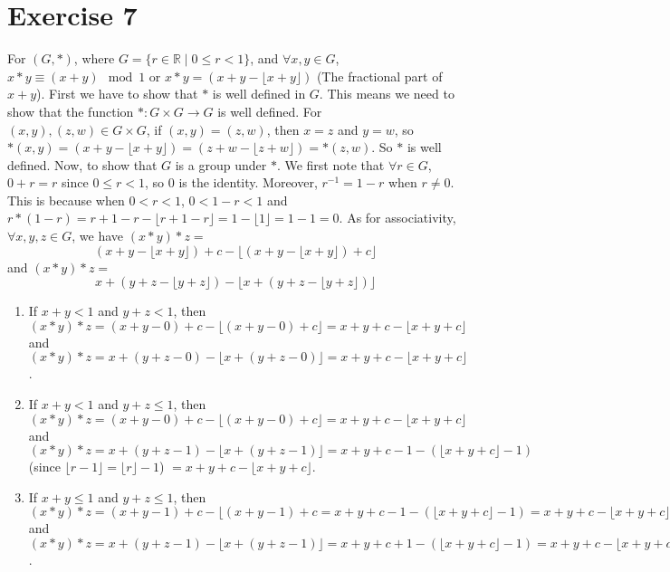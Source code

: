 \documentclass[12pt]{article}
\newcommand{\R}{\mathbb{R}}
\begin{document}
    \section*{Exercise 7}
    For $(G, \ast)$, where $G = \{r \in \R \mid 0 \leqslant r < 1\}$,
    and $\forall x, y \in G$, 
    $x \ast y \equiv (x + y) \mod{1}$
    or $x \ast y = (x + y - \lfloor x + y \rfloor)$
    (The fractional part of $x + y$).
    First we have to show that $\ast$ is well defined in $G$. 
    This means we need to show that the function $\ast:G \times G \to G$
    is well defined.
    For $(x, y), (z, w) \in G \times G$,
    if $(x, y) = (z, w)$,
    then $x = z$ and $y = w$,
    so $\ast(x, y) 
    = (x + y - \lfloor x + y \rfloor) 
    = (z + w - \lfloor z + w \rfloor) 
    = \ast(z, w)$.
    So $\ast$ is well defined.
    Now, to show that $G$ is a group under $\ast$.
    We first note that $\forall r \in G$, $0 + r = r$
    since $0 \leqslant r < 1$,
    so $0$ is the identity.
    Moreover, $r^{-1} = 1 - r$
    when $r \neq 0$.
    This is because when $0 < r < 1$, $0 < 1 - r < 1$
    and $r \ast (1 - r) 
    = r + 1 - r - \lfloor r + 1 - r \rfloor 
    = 1 - \lfloor 1 \rfloor 
    = 1 - 1 = 0$.
    As for associativity, $\forall x, y, z \in G$,
    we have $(x \ast y) \ast z = $
    \[(x + y - \lfloor x + y \rfloor) + c -
    \lfloor (x + y - \lfloor x + y \rfloor) + c \rfloor\]
    and $(x \ast y) \ast z = $
    \[x + (y + z - \lfloor y + z \rfloor)
    - \lfloor x + (y + z - \lfloor y + z \rfloor) \rfloor\] 
    \begin{enumerate}[label=\textbf{case \arabic*:}]
        \item
            If $x + y < 1$ and $y + z < 1$,
            then $(x \ast y) \ast z 
            = (x + y - 0) + c - \lfloor (x + y - 0) + c \rfloor
            = x + y + c - \lfloor x + y + c \rfloor$
            and $(x \ast y) \ast z 
            = x + (y + z - 0) - \lfloor x + (y + z - 0) \rfloor
            = x + y + c - \lfloor x + y + c \rfloor$.
        \item
            If $x + y < 1$ and $y + z \leqslant 1$,
            then $(x \ast y) \ast z 
            = (x + y - 0) + c - \lfloor (x + y - 0) + c \rfloor
            = x + y + c - \lfloor x + y + c \rfloor$
            and $(x \ast y) \ast z 
            = x + (y + z - 1) - \lfloor x + (y + z - 1) \rfloor
            = x + y + c - 1 - (\lfloor x + y + c \rfloor - 1)$ 
            (since $\lfloor r - 1 \rfloor = \lfloor r \rfloor - 1$)
            $ = x + y + c - \lfloor x + y + c \rfloor$.
        \item
            If $x + y \leqslant 1$ and $y + z \leqslant 1$,
            then $(x \ast y) \ast z
            = (x + y - 1) + c - \lfloor (x + y - 1) + c
            = x + y + c - 1 - (\lfloor x + y + c \rfloor - 1)
            = x + y + c - \lfloor x + y + c \rfloor$
            and $(x \ast y) \ast z
            = x + (y + z - 1) - \lfloor x + (y + z - 1) \rfloor
            = x + y + c + 1 - (\lfloor x + y + c \rfloor - 1)
            = x + y + c - \lfloor x + y + c \rfloor$.
    \end{enumerate}
\end{document}
